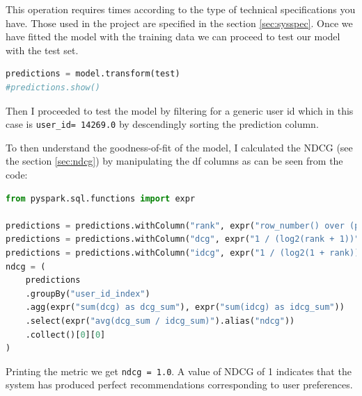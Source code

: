 \documentclass[12pt,english]{report}
\begin{document}
This operation requires times according to the type of technical specifications you have. Those used in the project are specified in the section \ref{sec:sysspec}.
Once we have fitted the model with the training data we can proceed to test our model with the test set.
\begin{lstlisting}[language={Python},escapechar=|,label={lst:predals},caption={Prediction over the test set with the ALS model}]
predictions = model.transform(test)
#predictions.show()
\end{lstlisting}
Then I proceeded to test the model by filtering for a generic user id which in this case is \texttt{user\_id\index = 14269.0} by descendingly sorting the prediction column. \par
To then understand the goodness-of-fit of the model, I calculated the NDCG (see the section \ref{sec:ndcg}) by manipulating the df columns as can be seen from the code:
\begin{lstlisting}[language={Python},escapechar=|,label={lst:ndcgals},caption={Calculating the ndcg over the predictions df obatined in ALS}]
from pyspark.sql.functions import expr

predictions = predictions.withColumn("rank", expr("row_number() over (partition by user_id_index order by prediction desc)"))
predictions = predictions.withColumn("dcg", expr("1 / (log2(rank + 1))"))
predictions = predictions.withColumn("idcg", expr("1 / (log2(1 + rank))"))
ndcg = (
    predictions
    .groupBy("user_id_index")
    .agg(expr("sum(dcg) as dcg_sum"), expr("sum(idcg) as idcg_sum"))
    .select(expr("avg(dcg_sum / idcg_sum)").alias("ndcg"))
    .collect()[0][0]
)
\end{lstlisting}
Printing the metric we get \texttt{ndcg = 1.0}. A value of NDCG of 1 indicates that the system has produced perfect recommendations corresponding to user preferences.
\end{document}
